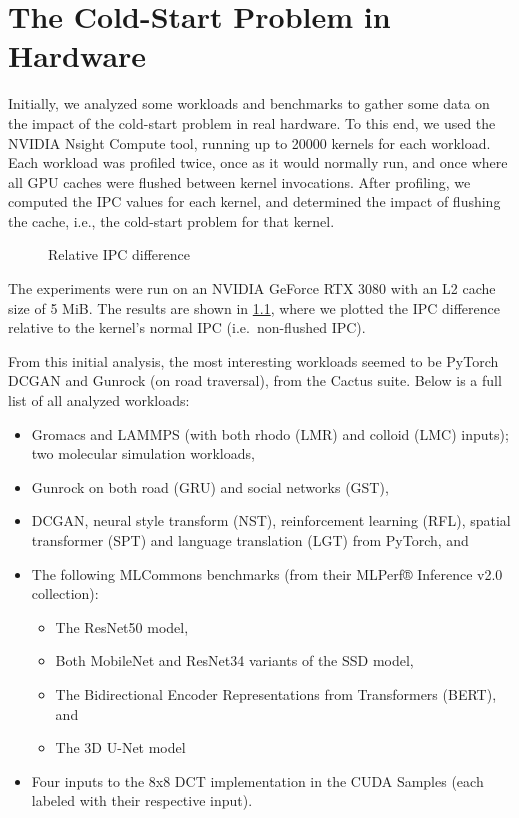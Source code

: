 \chapter{The Cold-Start Problem in Hardware}\label{ch:hw-analysis}

Initially, we analyzed some workloads and benchmarks to gather some data on the impact of the cold-start problem in real hardware.
To this end, we used the NVIDIA Nsight Compute tool, running up to 20000 kernels for each workload.
Each workload was profiled twice, once as it would normally run, and once where all GPU caches were flushed between kernel invocations.
After profiling, we computed the IPC values for each kernel, and determined the impact of flushing the cache, i.e., the cold-start problem for that kernel.

\begin{figure}
    \centering
    \resizebox{0.45\textwidth}{!}{}
    \resizebox{0.45\textwidth}{!}{}
    \caption{Relative IPC difference}
    \label{fig:ipc_diff}
\end{figure}

The experiments were run on an NVIDIA GeForce RTX 3080\cite{nvidia-wp} with an L2 cache size of 5 MiB\@.
The results are shown in \cref{fig:ipc_diff}, where we plotted the IPC difference relative to the kernel's normal IPC (i.e.\ non-flushed IPC).

From this initial analysis, the most interesting workloads seemed to be PyTorch DCGAN\cite{dcgan} and Gunrock\cite{gru} (on road traversal), from the Cactus\cite{cactus} suite.
Below is a full list of all analyzed workloads:
\begin{itemize}
    \item Gromacs\cite{gromacs} and LAMMPS\cite{LAMMPS} (with both rhodo (LMR) and colloid (LMC) inputs); two molecular simulation workloads,
    \item Gunrock on both road (GRU) and social networks (GST),
    \item DCGAN, neural style transform (NST)\cite{nst}, reinforcement learning (RFL), spatial transformer (SPT)\cite{spt} and language translation (LGT) from PyTorch, and
    \item The following MLCommons benchmarks (from their MLPerf® Inference v2.0 collection):
    \begin{itemize}
        \item The ResNet50 model\cite{resnet50},
        \item Both MobileNet and ResNet34 variants of the SSD model,
        \item The Bidirectional Encoder Representations from Transformers (BERT)\cite{bert}, and
        \item The 3D U-Net model\cite{3d-unet}
    \end{itemize}
    \item Four inputs to the 8x8 DCT implementation in the CUDA Samples (each labeled with their respective input).
\end{itemize}
\FloatBarrier

